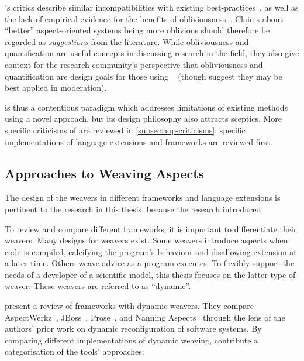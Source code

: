 \Aspectorientation{}'s critics describe similar incompatibilities with existing
best-practices~\cite{przybylek2010wrong,Constantinides04aopconsidered}, as well
as the lack of empirical evidence for the benefits of
obliviousness~\cite{steimann06paradoxical}. Claims about ``better''
aspect-oriented systems being more oblivious should therefore be regarded as
\emph{suggestions} from the literature. While obliviousness and quantification
are useful concepts in discussing research in the field, they also give context
for the research community's perspective that obliviousness and quantification
are design goals for those using
\aop{}~\cite{AspectCplusplusDesignImpl,kell2008survey,Charfi2006AspectOrientedWL}
(though \citet{leavens2007multiple} suggest they may be best applied in
moderation).

\Aop{} is thus a contentious paradigm which addresses limitations
of existing methods using a novel approach, but its design philosophy also
attracts sceptics. More specific criticisms of \aop{} are reviewed in
\cref{subsec:aop-criticisms}; specific implementations of \aop{} language
extensions and frameworks are reviewed first.


\subsection{Approaches to Weaving Aspects}
\label{sec:dynamic_aop_review}

The design of the weavers in different \aspectorientation{} frameworks and
language extensions is pertinent to the research in this thesis, because the
research introduced 

To review and compare different \aop{} frameworks, it is important to
differentiate their weavers. Many designs for weavers exist. Some weavers
introduce aspects when code is compiled, calcifying the program's behaviour and
disallowing extension at a later time. Others weave advice as a program
executes. To flexibly support the needs of a developer of a scientific model,
this thesis focuses on the latter type of weaver. These weavers are referred to
as ``dynamic''.

\citet{dynamicAOchitchyan} present a review of \aspectorientation{} frameworks
with dynamic weavers. They compare AspectWerkz~\cite{boner2004aspectwerkz},
JBoss~\cite{fleury2003jboss}, Prose~\cite{popovici2002PROSE}, and Nanning
Aspects~\cite{nanning_aspects_repo} through the lens of the authors' prior work
on dynamic reconfiguration of software systems. By comparing different
implementations of dynamic weaving, \citeauthor{dynamicAOchitchyan} contribute a
categorisation of the tools' approaches:

